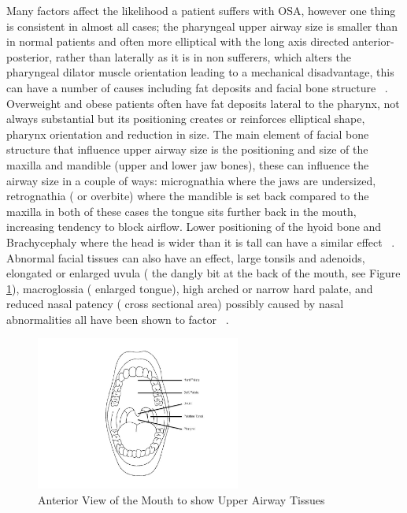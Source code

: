Many factors affect the likelihood a patient suffers with OSA, however one thing is consistent in almost all cases; the pharyngeal upper airway size is smaller than in normal patients and often more elliptical with the long axis directed anterior-posterior, rather than laterally as it is in non sufferers, which alters the pharyngeal dilator muscle orientation leading to a mechanical disadvantage, this can have a number of causes including fat deposits and facial bone structure ~\cite{leiter1996upper}. Overweight and obese patients often have fat deposits lateral to the pharynx, not always substantial but its positioning creates or reinforces elliptical shape, pharynx orientation and reduction in size. 
The main element of facial bone structure that influence upper airway size is the positioning and size of the maxilla and mandible (upper and lower jaw bones), these can influence the airway size in a couple of ways: micrognathia where the jaws are undersized, retrognathia ( or overbite) where the mandible is set back compared to the maxilla in both of these cases the tongue sits further back in the mouth, increasing tendency to block airflow. Lower positioning of the hyoid bone and Brachycephaly where the head is wider than it is tall can have a similar effect ~\cite{lowel1995cephalometric}.
Abnormal facial tissues can also have an effect, large tonsils and adenoids, elongated or enlarged uvula ( the dangly bit at the back of the mouth, see Figure \ref{fig: Anterior-View-Mouth}), macroglossia ( enlarged tongue), high arched or narrow hard palate, and reduced nasal patency ( cross sectional area) possibly caused by nasal abnormalities all have been shown to factor ~\cite{schwab1995upper}.
\begin{figure}[h]
\centering
\includegraphics[width=0.6\textwidth]{drawings/Anterior-View-Mouth}
\caption{Anterior View of the Mouth to show Upper Airway Tissues~\cite{anteriormouth}}
\label{fig: Anterior-View-Mouth}
\end{figure}

